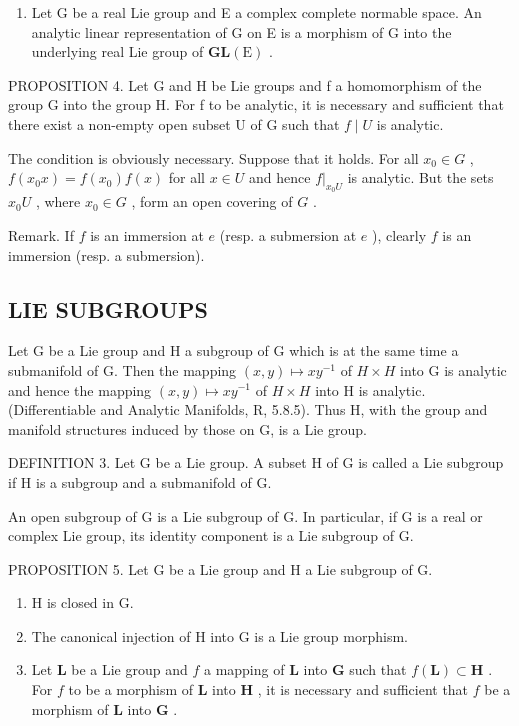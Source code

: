\begin{enumerate}
\def\labelenumi{(\arabic{enumi})}
\setcounter{enumi}{3}
\tightlist
\item
  Let G be a real Lie group and E a complex complete normable space. An analytic linear representation of G on E is a morphism of G into the underlying real Lie group of \(\mathbf{GL}(\mathrm{E})\) .
\end{enumerate}

PROPOSITION 4. Let G and H be Lie groups and f a homomorphism of the group G into the group H. For f to be analytic, it is necessary and sufficient that there exist a non-empty open subset U of G such that \(f \mid U\) is analytic.

The condition is obviously necessary. Suppose that it holds. For all \(x_0 \in G\) , \(f(x_0x) = f(x_0)f(x)\) for all \(x \in U\) and hence \(f|_{x_0U}\) is analytic. But the sets \(x_0U\) , where \(x_0 \in G\) , form an open covering of \(G\) .

Remark. If \(f\) is an immersion at \(e\) (resp. a submersion at \(e\) ), clearly \(f\) is an immersion (resp. a submersion).

\subsection{LIE SUBGROUPS}

Let G be a Lie group and H a subgroup of G which is at the same time a submanifold of G. Then the mapping \((x,y)\mapsto xy^{-1}\) of \(H\times H\) into G is analytic and hence the mapping \((x,y)\mapsto xy^{-1}\) of \(H\times H\) into H is analytic. (Differentiable and Analytic Manifolds, R, 5.8.5). Thus H, with the group and manifold structures induced by those on G, is a Lie group.

DEFINITION 3. Let G be a Lie group. A subset H of G is called a Lie subgroup if H is a subgroup and a submanifold of G.

An open subgroup of G is a Lie subgroup of G. In particular, if G is a real or complex Lie group, its identity component is a Lie subgroup of G.

PROPOSITION 5. Let G be a Lie group and H a Lie subgroup of G.

\begin{enumerate}
\def\labelenumi{(\roman{enumi})}
\item
  H is closed in G.
\item
  The canonical injection of H into G is a Lie group morphism.
\item
  Let \(\mathbf{L}\) be a Lie group and \(f\) a mapping of \(\mathbf{L}\) into \(\mathbf{G}\) such that \(f(\mathbf{L}) \subset \mathbf{H}\) . For \(f\) to be a morphism of \(\mathbf{L}\) into \(\mathbf{H}\) , it is necessary and sufficient that \(f\) be a morphism of \(\mathbf{L}\) into \(\mathbf{G}\) .
\end{enumerate}

